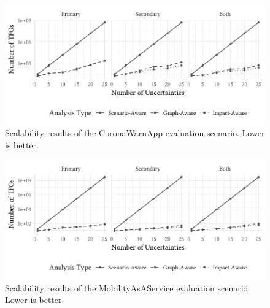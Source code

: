 \begin{figure}
  \centering
  \includegraphics[width=\textwidth]{figures/chapter9/plot-CWA.pdf}
  \caption{Scalability results of the CoronaWarnApp evaluation scenario. Lower is better.}
  \label{fig:evaluation:result:g7:cwa}
\end{figure}

\begin{figure}
  \centering
  \includegraphics[width=\textwidth]{figures/chapter9/plot-MAAS.pdf}
  \caption{Scalability results of the MobilityAsAService evaluation scenario. Lower is better.}
  \label{fig:evaluation:result:g7:maas}
\end{figure}

